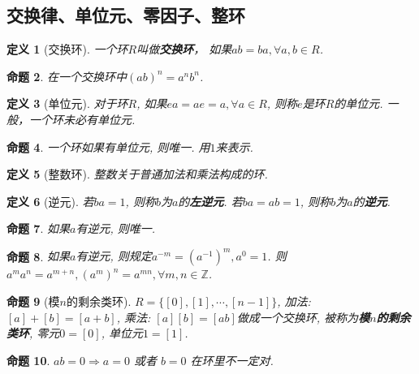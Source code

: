 \documentclass[UTF8]{ctexart}
\newtheorem{Definition}{定义}%
\newtheorem{Proposition}[Definition]{命题}
\begin{document}
\subsection{交换律、单位元、零因子、整环}

\begin{Definition}[交换环]
一个环$R$叫做\textbf{交换环}， 如果$ab = ba,  \forall a, b \in R$.
\end{Definition}

\begin{Proposition}
在一个交换环中${(ab)}^n = a^n b^n$.
\end{Proposition}

\begin{Definition}[单位元]
对于环$R$, 如果$ea = ae = a, \forall a \in R$, 则称$e$是环$R$的单位元. 一般，一个环未必有单位元.
\end{Definition}

\begin{Proposition}
一个环如果有单位元, 则唯一. 用$1$来表示.
\end{Proposition}

\begin{Definition}[整数环]
整数关于普通加法和乘法构成的环.
\end{Definition}

\begin{Definition}[逆元]
若$ba = 1$, 则称$b$为$a$的\textbf{左逆元}. 若$ba = ab = 1$, 则称$b$为$a$的\textbf{逆元}. 
\end{Definition}

\begin{Proposition}
如果$a$有逆元, 则唯一.
\end{Proposition}

\begin{Proposition}
如果$a$有逆元, 则规定$a^{-m} = {(a^{-1})}^m, a^0 = 1$. 则$a^m a^n = a^{m+n}, {(a^m)}^n = a^{mn}, \forall m, n \in \mathbb{Z}$.
\end{Proposition}

\begin{Proposition}[模$n$的剩余类环]
$R = \{ [0], [1], \cdots, [n-1] \}$, 加法: $[a] + [b] = [a+b]$, 乘法: $[a][b] = [ab]$做成一个交换环, 被称为\textbf{模$n$的剩余类环}, 零元$0 = [0]$, 单位元$1 = [1]$.
\end{Proposition}

\begin{Proposition}
$ab = 0 \Rightarrow a = 0 $ 或者 $b = 0$ 在环里不一定对.
\end{Proposition}
\end{document}

